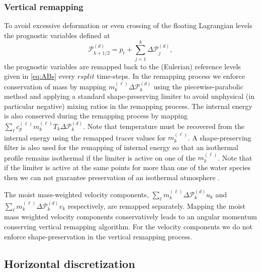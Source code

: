 \documentclass{agujournal}
\begin{document}
\subsubsection{Vertical remapping}\label{sec:verticalRemappin}
To avoid excessive deformation or even crossing of the floating Lagrangian levels the prognostic variables defined at
\begin{equation}
\mathcal{P}^{(d)}_{k+1/2}=p_t+\sum_{j=1}^{k}\Delta \mathcal{P}^{(d)}_j,
\end{equation}
the prognostic variables are remapped back to the (Eulerian) reference levels given in \eqref{eq:ABs} every $rsplit$ time-steps. In the remapping process we enforce conservation of mass by mapping $m^{(\ell)}_k\Delta \mathcal{P}^{(d)}_k$ using the piecewise-parabolic method \cite[PPM; ][]{CW1984JCP} and applying a standard shape-preserving limiter to avoid unphysical (in particular negative) mixing ratios in the remapping process. The internal energy is also conserved during the remapping process by mapping $\sum_\ell c_p^{(\ell)} m_k^{(\ell)}T_k \Delta \mathcal{P}^{(d)}_k$. Note that temperature must be recovered from the internal energy using the remapped tracer values for $m^{(\ell)}_k$. A shape-preserving filter is also used for the remapping of internal energy so that an isothermal profile remains isothermal if the limiter is active on one of the $m^{(\ell)}_k$. Note that if the limiter is active at the same points for more than one of the water species then we can not guarantee preservation of an isothermal atmosphere \citep[see, e.g., Section 2.5 in ][]{LT2011QJR}.

The moist mass-weighted velocity components, $\sum_\ell m^{(\ell)}_k \Delta \mathcal{P}^{(d)}_k u_k$ and $\sum_\ell m_k^{(\ell)} \Delta \mathcal{P}^{(d)}_k v_k$ respectively, are remapped separately. Mapping the moist mass weighted velocity components conservatively leads to an angular momentum conserving vertical remapping algorithm. For the velocity components we do not enforce shape-preservation in the vertical remapping process.
\subsection{Horizontal discretization}

\end{document}

